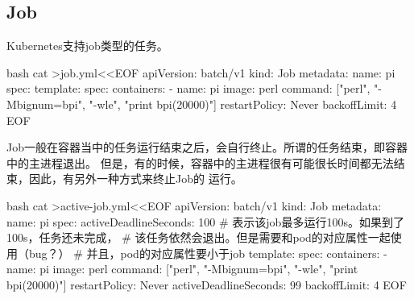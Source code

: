 \subsection{Job}
Kubernetes支持job类型的任务。
\begin{code-block}{bash}
cat >job.yml<<EOF
apiVersion: batch/v1
kind: Job
metadata:
  name: pi
spec:
  template:
    spec:
      containers:
      - name: pi
        image: perl
        command: ["perl",  "-Mbignum=bpi", "-wle", "print bpi(20000)"]
      restartPolicy: Never
  backoffLimit: 4
EOF
\end{code-block}
Job一般在容器当中的任务运行结束之后，会自行终止。所谓的任务结束，即容器中的主进程退出。
但是，有的时候，容器中的主进程很有可能很长时间都无法结束，因此，有另外一种方式来终止Job的
运行。
\begin{code-block}{bash}
cat >active-job.yml<<EOF
apiVersion: batch/v1
kind: Job
metadata:
  name: pi
spec:
  activeDeadlineSeconds: 100   # 表示该job最多运行100s。如果到了100s，任务还未完成，
                               # 该任务依然会退出。但是需要和pod的对应属性一起使用（bug？）
                               # 并且，pod的对应属性要小于job
  template:
    spec:
      containers:
      - name: pi
        image: perl
        command: ["perl",  "-Mbignum=bpi", "-wle", "print bpi(20000)"]
      restartPolicy: Never
      activeDeadlineSeconds: 99
  backoffLimit: 4
EOF
\end{code-block}